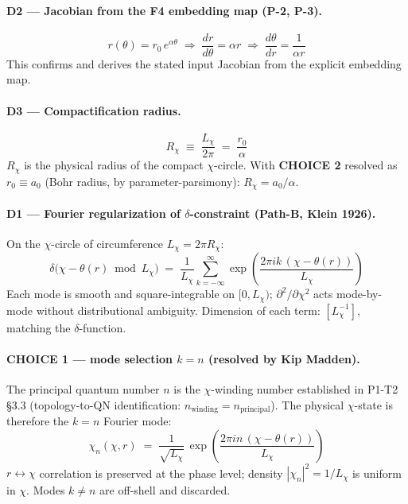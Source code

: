 \documentclass[11pt]{article}
\newcommand{\Lchi}{L_\chi}
\begin{document}
\paragraph{D2 — Jacobian from the F4 embedding map (P-2, P-3).}
\begin{equation}
  r(\theta) = r_0\,e^{\alpha\theta}
  \;\Longrightarrow\;
  \frac{dr}{d\theta} = \alpha r
  \;\Longrightarrow\;
  \frac{d\theta}{dr} = \frac{1}{\alpha r}
  \tag{2.1}
\end{equation}
This confirms and derives the stated input Jacobian from the explicit embedding map.

\paragraph{D3 — Compactification radius.}
\begin{equation}
  R_\chi \;\equiv\; \frac{\Lchi}{2\pi} \;=\; \frac{r_0}{\alpha}
  \tag{2.2}
\end{equation}
$R_\chi$ is the physical radius of the compact $\chi$-circle.
With \textbf{CHOICE 2} resolved as $r_0 \equiv a_0$ (Bohr radius, by parameter-parsimony):
$R_\chi = a_0/\alpha$.

\paragraph{D1 — Fourier regularization of $\delta$-constraint (Path-B, Klein 1926).}
On the $\chi$-circle of circumference $\Lchi = 2\pi R_\chi$:
\begin{equation}
  \delta\!\bigl(\chi - \theta(r)\bmod\Lchi\bigr)
  \;=\; \frac{1}{\Lchi}\sum_{k=-\infty}^{\infty}
        \exp\!\!\left(\frac{2\pi i k\,(\chi-\theta(r))}{\Lchi}\right)
  \tag{2.3}
\end{equation}
Each mode is smooth and square-integrable on $[0,\Lchi)$; $\partial^2/\partial\chi^2$ acts
mode-by-mode without distributional ambiguity.  Dimension of each term: $[\Lchi^{-1}]$, matching
the $\delta$-function. \checkmark

\paragraph{CHOICE 1 — mode selection $k=n$ (resolved by Kip Madden).}
The principal quantum number $n$ is the $\chi$-winding number established in P1-T2 \S3.3
(topology-to-QN identification: $n_{\mathrm{winding}} = n_{\mathrm{principal}}$).
The physical $\chi$-state is therefore the $k=n$ Fourier mode:
\begin{equation}
  \chi_n(\chi,r) \;=\; \frac{1}{\sqrt{\Lchi}}\,
    \exp\!\!\left(\frac{2\pi i n\,(\chi-\theta(r))}{\Lchi}\right)
  \tag{2.4}
\end{equation}
$r\leftrightarrow\chi$ correlation is preserved at the phase level; density
$|\chi_n|^2 = 1/\Lchi$ is uniform in $\chi$. Modes $k\ne n$ are off-shell and discarded.
\end{document}
